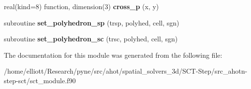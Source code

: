 \begin{DoxyCompactItemize}
\item 
\hypertarget{classsct__module_ad149f8f31c02c110bf796ddd9ae50ed3}{real(kind=8) function, dimension(3) {\bfseries cross\-\_\-p} (x, y)}\label{classsct__module_ad149f8f31c02c110bf796ddd9ae50ed3}

\item 
\hypertarget{classsct__module_a43a90e2d39d5a4ea59edb46d8729eff4}{subroutine {\bfseries set\-\_\-polyhedron\-\_\-sp} (trsp, polyhed, cell, sgn)}\label{classsct__module_a43a90e2d39d5a4ea59edb46d8729eff4}

\item 
\hypertarget{classsct__module_ab8166d3e088b06fe79807d7aa629e8e4}{subroutine {\bfseries set\-\_\-polyhedron\-\_\-sc} (trsc, polyhed, cell, sgn)}\label{classsct__module_ab8166d3e088b06fe79807d7aa629e8e4}

\end{DoxyCompactItemize}


The documentation for this module was generated from the following file\-:\begin{DoxyCompactItemize}
\item 
/home/elliott/\-Research/pyne/src/ahot/spatial\-\_\-solvers\-\_\-3d/\-S\-C\-T-\/\-Step/src\-\_\-ahotn-\/step-\/sct/sct\-\_\-module.\-f90\end{DoxyCompactItemize}
